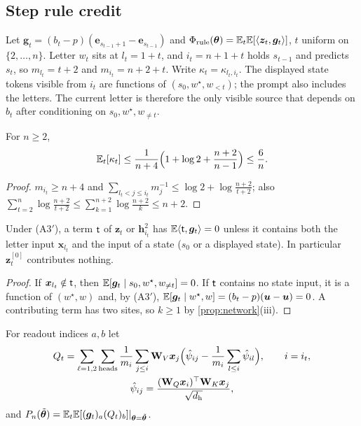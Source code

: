 \subsection{Step rule credit}

Let $\bm g_t=(b_t-p)(\bm e_{s_{t-1}+1}-\bm e_{s_{t-1}})$ and $\Phi_{\mathrm{rule}}(\bm\theta)=\mathbb E_t\mathbb E[\langle\bm z_t,\bm g_t\rangle]$, $t$ uniform on $\{2,\ldots,n\}$. Letter $w_t$ sits at
$l_t=1+t$, and $i_t=n+1+t$ holds $s_{t-1}$ and predicts $s_t$, so $m_{l_t}=t+2$ and $m_{i_t}=n+2+t$. Write $\kappa_t=\kappa_{l_t,i_t}$. The displayed state tokens visible from $i_t$ are functions of $(s_0,w^\star,w_{<t})$; the prompt also includes the letters. The current letter is therefore the only visible source that depends on $b_t$ after conditioning on $s_0,w^\star,w_{\ne t}$.

\begin{lemma}
\label{lem:dilution-average}
For $n\ge2$,
\begin{equation}
 \mathbb E_t[\kappa_t]\le\frac{1}{n+4}\Bigl(1+\log2+\frac{n+2}{n-1}\Bigr)\le\frac{6}{n} .
 \label{eq:dilution-avg}
\end{equation}
\end{lemma}

\begin{proof}
$m_{i_t}\ge n+4$ and $\sum_{l_t<j\le i_t}m_j^{-1}\le\log2+\log\frac{n+2}{t+2}$; also $\sum_{t=2}^n\log\frac{n+2}{t+2}\le\sum_{k=1}^{n+2}\log\frac{n+2}{k}\le n+2$.
\end{proof}

\begin{lemma}
\label{lem:rule-sites}
Under (A3$'$), a term $\mathsf t$ of $\bm z_t$ or $\bm h^2_{i_t}$ has $\mathbb E\langle\mathsf t,\bm g_t\rangle=0$ unless it contains both the letter input $\bm x_{l_t}$ and the input of a
state ($s_0$ or a displayed state). In particular $\bm z^{[0]}_t$ contributes nothing.
\end{lemma}

\begin{proof}
If $\bm x_{l_t}\notin\mathsf t$, then $\mathbb E[\bm g_t\mid s_0,w^\star,w_{\ne t}]=0$. If $\mathsf t$ contains no state input, it is a function of $(w^\star,w)$ and, by (A3$'$),
$\mathbb E[\bm g_t\mid w^\star,w]=(b_t-p)(\bm u-\bm u)=0$. A contributing term has two sites, so $k\ge1$ by \cref{prop:network}(iii).
\end{proof}

For readout indices $a,b$ let
\begin{gather*}
 Q_t=\sum_{\ell=1,2}\sum_{\mathrm{heads}}\frac{1}{m_i}\sum_{j\le i}\mathbf W_V\bm x_j\Bigl(\hat\psi_{ij}-\frac{1}{m_i}\sum_{l\le i}\hat\psi_{il}\Bigr),\qquad i=i_t,\\
 \hat\psi_{ij}=\frac{(\mathbf W_Q\bm x_i)^\top\mathbf W_K\bm x_j}{\sqrt{d_{\mathrm h}}},
\end{gather*}
and $P_n(\tilde{\bm\theta})=\mathbb E_t\mathbb E[(\bm g_t)_a(Q_t)_b]|_{\bm\theta=\tilde{\bm\theta}}$.

